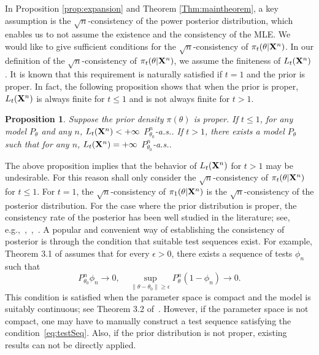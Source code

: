 \documentclass[11pt]{article}
\theoremstyle{plain}
\newtheorem{proposition}{\quad\quad Proposition}
\theoremstyle{definition}
\theoremstyle{remark}
\begin{document}
In Proposition \ref{prop:expansion} and Theorem \ref{Thm:maintheorem},
a key assumption is the $\sqrt{n}$-consistency of the power posterior distribution, which enables us to not assume the existence and the consistency of the MLE.
We would like to give sufficient conditions for the $\sqrt{n}$-consistency of $\pi_t(\theta|\mathbf{X}^{n})$.
In our definition of the $\sqrt{n}$-consistency of $\pi_t(\theta| \mathbf{X}^n)$, we assume the finiteness of $L_t(\mathbf{X}^n)$.
It is known that this requirement is naturally satisfied if $t=1$ and the prior is proper.
In fact, the following proposition shows that when the prior is proper, $L_t(\mathbf{X}^n)$ is always finite for $t\leq 1$ and is not always finite for $t>1$.
\begin{proposition}
    Suppose the prior density $\pi(\theta)$ is proper.
    If $t\leq 1$, for any model $P_{\theta}$ and any $n$, $L_t(\mathbf{X}^{n})< +\infty$ $P_{\theta_0}^n$-a.s..
    If $t> 1$, there exists a model $P_{\theta}$ such that for any $n$, $L_t(\mathbf{X}^{n}) = +\infty$ $P_{\theta_0}^n$-a.s..
    \label{exprop}
\end{proposition}
The above proposition implies that the behavior of $L_t(\mathbf{X}^{n})$ for $t>1$ may be undesirable.
For this reason shall only consider the $\sqrt n$-consistency of $\pi_t(\theta | \mathbf{X}^{n})$ for $t\leq 1$.
For $t=1$, the $\sqrt{n}$-consistency of $\pi_1(\theta | \mathbf{X}^{n})$ is the $\sqrt{n}$-consistency of the posterior distribution.
For the case where the prior distribution is proper,
the consistency rate of the posterior has been well studied in the literature; see, e.g.,~\cite{ghosal2000},~\cite{Shen2001Rates},~\cite{vaart2007convergence}.
A popular and convenient way of establishing the consistency of posterior is through the condition that suitable test sequences exist.
For example, Theorem 3.1 of \cite{Kleijn2012The} assumes that for every $\epsilon>0$, there exists a sequence of tests $\phi_n$ such that
\begin{equation}\label{eq:testSeq}
    P_{\theta_0}^n\phi_n\to 0,\quad \sup_{\|\theta-\theta_0\|\geq \epsilon} P_\theta^n(1-\phi_n)\to 0.
\end{equation}
This condition is satisfied when the parameter space is compact and the model is suitably continuous; see Theorem 3.2 of~\cite{Kleijn2012The}.
However, if the parameter space is not compact, one may have to manually construct a test sequence satisfying the condition~\eqref{eq:testSeq}.
Also, if the prior distribution is not proper, existing results can not be directly applied.
\end{document}
